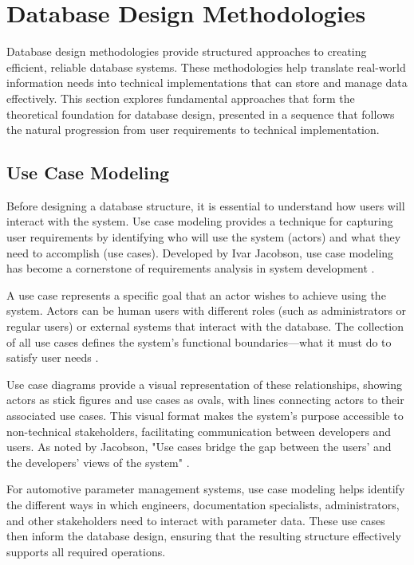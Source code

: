 \section{Database Design Methodologies}
\label{sec:database-design-methodologies}

Database design methodologies provide structured approaches to creating efficient, reliable database systems. These methodologies help translate real-world information needs into technical implementations that can store and manage data effectively. This section explores fundamental approaches that form the theoretical foundation for database design, presented in a sequence that follows the natural progression from user requirements to technical implementation.

\subsection{Use Case Modeling}
\label{subsec:use-case-modeling}

Before designing a database structure, it is essential to understand how users will interact with the system. Use case modeling provides a technique for capturing user requirements by identifying who will use the system (actors) and what they need to accomplish (use cases). Developed by Ivar Jacobson, use case modeling has become a cornerstone of requirements analysis in system development \cite{jacobson2004use}.

A use case represents a specific goal that an actor wishes to achieve using the system. Actors can be human users with different roles (such as administrators or regular users) or external systems that interact with the database. The collection of all use cases defines the system's functional boundaries—what it must do to satisfy user needs \cite{jacobson2004use}.

Use case diagrams provide a visual representation of these relationships, showing actors as stick figures and use cases as ovals, with lines connecting actors to their associated use cases. This visual format makes the system's purpose accessible to non-technical stakeholders, facilitating communication between developers and users. As noted by Jacobson, "Use cases bridge the gap between the users' and the developers' views of the system" \cite{jacobson2004use}.

For automotive parameter management systems, use case modeling helps identify the different ways in which engineers, documentation specialists, administrators, and other stakeholders need to interact with parameter data. These use cases then inform the database design, ensuring that the resulting structure effectively supports all required operations.


